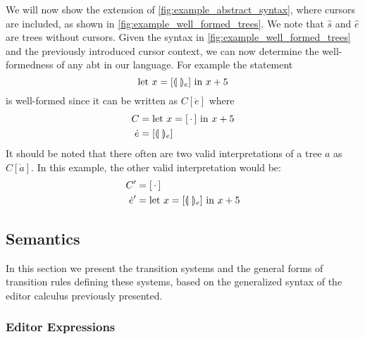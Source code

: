 \documentclass[sigplan,anonymous,review]{acmart}
\begin{document}
\begin{example}\label{ex:well_formed_trees}
   We will now show the extension of \cref{fig:example_abstract_syntax}, where cursors are included, as shown in \cref{fig:example_well_formed_trees}. We note that $\hat{s}$ and $\hat{e}$ are trees without cursors.
    Given the syntax in \cref{fig:example_well_formed_trees} and the previously introduced cursor context, we can now determine the well-formedness of any abt in our language. For example the statement
    \begin{equation*}
        \text{let $x=[\llparenthesis \ \rrparenthesis_e]$ in $x+5$}
    \end{equation*}
    is well-formed since it can be written as $C[\dot{e}]$ where
    \begin{align*}
        C &= \text{let $x=[ \, \cdot \, ]$ in $x+5$} \\
        \dot{e}&= [\llparenthesis \ \rrparenthesis_e]
    \end{align*}
    It should be noted that there often are two valid interpretations of a tree $a$ as $C[\dot{a}]$. In this example, the other valid interpretation would be:
    \begin{align*}
        C' &= [ \, \cdot \, ] \\
        \dot{e}' &= \text{let $x=[\llparenthesis \ \rrparenthesis_e]$ in $x+5$}
    \end{align*}
\end{example}

\subsection{Semantics}
In this section we present the transition systems and the general forms of transition rules defining these systems, based on the generalized syntax of the editor calculus previously presented. 

\subsubsection{Editor Expressions} \label{sec:Semantics}
\end{document}
